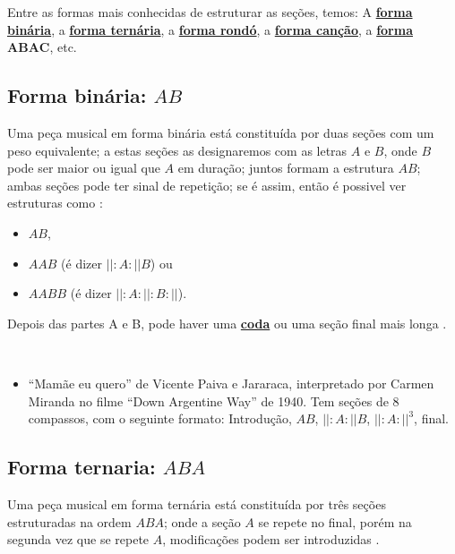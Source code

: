 Entre as formas mais conhecidas de estruturar as seções, temos:
A \hyperref[subsec:formabinaria]{\textbf{forma binária}}, 
a \hyperref[subsec:formaternaria]{\textbf{forma ternária}}, 
a \hyperref[subsec:formarondo]{\textbf{forma rondó}}, 
a \hyperref[subsec:formacancao]{\textbf{forma canção}}, 
a \hyperref[subsec:formaabac]{\textbf{forma $\mathbf{ABAC}$}}, 
etc.
 



\subsection{Forma binária: $AB$}
\label{subsec:formabinaria}
Uma peça musical em forma binária está constituída por duas seções 
com um peso equivalente; 
a estas seções as designaremos com as letras $A$ e $B$, 
onde $B$ pode ser maior ou igual que $A$ em duração; juntos
formam a estrutura $AB$;
ambas seções pode ter sinal de repetição; se é assim, então é possivel ver estruturas como 
\cite[pp. 71]{bennett1993elementos} \cite[pp. 93]{copland1974ouvir}:
\begin{itemize}
\item $AB$,
\item $AAB$ (é dizer $||:A:||B$) ou 
\item $AABB$ (é dizer $||:A:||:B:||$).
\end{itemize}
Depois das partes A e B, 
pode haver uma \hyperref[ref:Coda]{\textbf{coda}} 
ou uma seção final mais longa \cite[pp. 86-87]{holland2013music}.

\begin{example} ~
\begin{itemize}
\item ``Mamãe eu quero'' de Vicente Paiva e Jararaca,
interpretado por Carmen Miranda no filme ``Down Argentine Way'' de 1940. 
Tem seções de 8 compassos,
com o seguinte formato:
Introdução, $AB$, $||:A:||B$, $||:A:||^3$, final.
\end{itemize}
\end{example}




\subsection{Forma ternaria: $ABA$}
\label{subsec:formaternaria}
Uma peça musical em forma ternária está constituída por três seções 
estruturadas na ordem $ABA$; 
onde a seção $A$ se repete no final,
porém na segunda vez que se repete $A$,
modificações podem ser introduzidas \cite[pp. 71]{bennett1993elementos} \cite[pp. 88]{holland2013music}.


